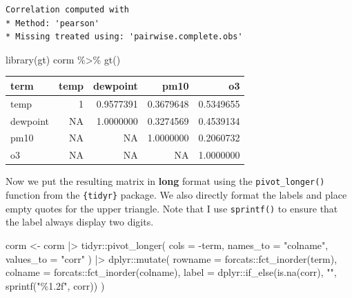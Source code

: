\documentclass[
  letterpaper,
  DIV=11,
  numbers=noendperiod]{scrreprt}
\newenvironment{Shaded}{\begin{snugshade}}{\end{snugshade}}
\newcommand{\AttributeTok}[1]{\textcolor[rgb]{0.40,0.45,0.13}{#1}}
\newcommand{\FunctionTok}[1]{\textcolor[rgb]{0.28,0.35,0.67}{#1}}
\newcommand{\NormalTok}[1]{\textcolor[rgb]{0.00,0.23,0.31}{#1}}
\newcommand{\OtherTok}[1]{\textcolor[rgb]{0.00,0.23,0.31}{#1}}
\newcommand{\SpecialCharTok}[1]{\textcolor[rgb]{0.37,0.37,0.37}{#1}}
\newcommand{\StringTok}[1]{\textcolor[rgb]{0.13,0.47,0.30}{#1}}
\begin{document}
\begin{verbatim}
Correlation computed with
* Method: 'pearson'
* Missing treated using: 'pairwise.complete.obs'
\end{verbatim}

\begin{Shaded}
\begin{Highlighting}[]
\FunctionTok{library}\NormalTok{(gt)}
\NormalTok{corm }\SpecialCharTok{\%\textgreater{}\%} \FunctionTok{gt}\NormalTok{()}
\end{Highlighting}
\end{Shaded}

\begin{longtable*}{lrrrr}
\toprule
term & temp & dewpoint & pm10 & o3 \\ 
\midrule\addlinespace[2.5pt]
temp & 1 & 0.9577391 & 0.3679648 & 0.5349655 \\ 
dewpoint & NA & 1.0000000 & 0.3274569 & 0.4539134 \\ 
pm10 & NA & NA & 1.0000000 & 0.2060732 \\ 
o3 & NA & NA & NA & 1.0000000 \\ 
\bottomrule
\end{longtable*}

Now we put the resulting matrix in \textbf{long} format using the
\texttt{pivot\_longer()} function from the \texttt{\{tidyr\}} package.
We also directly format the labels and place empty quotes for the upper
triangle. Note that I use \texttt{sprintf()} to ensure that the label
always display two digits.

\begin{Shaded}
\begin{Highlighting}[]
\NormalTok{corm }\OtherTok{\textless{}{-}}\NormalTok{ corm }\SpecialCharTok{|\textgreater{}}
\NormalTok{  tidyr}\SpecialCharTok{::}\FunctionTok{pivot\_longer}\NormalTok{(}
    \AttributeTok{cols =} \SpecialCharTok{{-}}\NormalTok{term,}
    \AttributeTok{names\_to =} \StringTok{"colname"}\NormalTok{,}
    \AttributeTok{values\_to =} \StringTok{"corr"}
\NormalTok{  ) }\SpecialCharTok{|\textgreater{}}
\NormalTok{  dplyr}\SpecialCharTok{::}\FunctionTok{mutate}\NormalTok{(}
    \AttributeTok{rowname =}\NormalTok{ forcats}\SpecialCharTok{::}\FunctionTok{fct\_inorder}\NormalTok{(term),}
    \AttributeTok{colname =}\NormalTok{ forcats}\SpecialCharTok{::}\FunctionTok{fct\_inorder}\NormalTok{(colname),}
    \AttributeTok{label =}\NormalTok{ dplyr}\SpecialCharTok{::}\FunctionTok{if\_else}\NormalTok{(}\FunctionTok{is.na}\NormalTok{(corr), }\StringTok{""}\NormalTok{, }\FunctionTok{sprintf}\NormalTok{(}\StringTok{"\%1.2f"}\NormalTok{, corr))}
\NormalTok{  )}
\end{Highlighting}
\end{Shaded}
\end{document}
